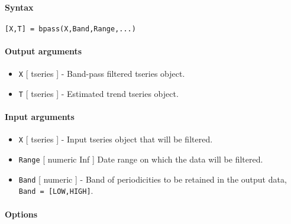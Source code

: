 


	\paragraph{Syntax}\label{syntax}

\begin{verbatim}
[X,T] = bpass(X,Band,Range,...)
\end{verbatim}

\paragraph{Output arguments}\label{output-arguments}

\begin{itemize}
\item
  \texttt{X} {[} tseries {]} - Band-pass filtered tseries object.
\item
  \texttt{T} {[} tseries {]} - Estimated trend tseries object.
\end{itemize}

\paragraph{Input arguments}\label{input-arguments}

\begin{itemize}
\item
  \texttt{X} {[} tseries {]} - Input tseries object that will be
  filtered.
\item
  \texttt{Range} {[} numeric \textbar{} Inf {]} Date range on which the
  data will be filtered.
\item
  \texttt{Band} {[} numeric {]} - Band of periodicities to be retained
  in the output data, \texttt{Band = {[}LOW,HIGH{]}}.
\end{itemize}

\paragraph{Options}\label{options}

